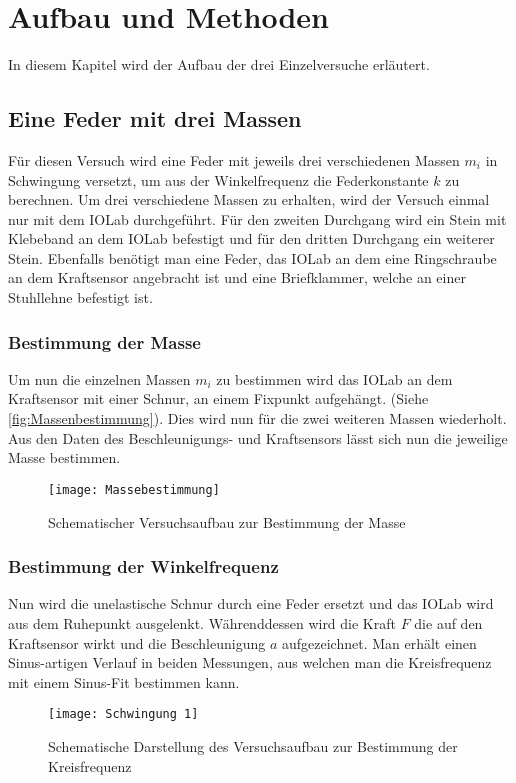 
\chapter{Aufbau und Methoden}
\label{sec:aufbau}
In diesem Kapitel wird der Aufbau der drei Einzelversuche erläutert.
\section{Eine Feder mit drei Massen}
Für diesen Versuch wird eine Feder mit jeweils drei verschiedenen Massen $m_i$ in Schwingung versetzt, um aus der Winkelfrequenz die Federkonstante $k$ zu berechnen. Um drei verschiedene Massen zu erhalten, wird der Versuch einmal nur mit dem IOLab durchgeführt. Für den zweiten Durchgang wird ein Stein mit Klebeband an dem IOLab befestigt und für den dritten Durchgang ein weiterer Stein. Ebenfalls benötigt man eine Feder, das IOLab an dem eine Ringschraube an dem Kraftsensor angebracht ist und eine Briefklammer, welche an einer Stuhllehne befestigt ist.
\subsection{Bestimmung der Masse}
Um nun die einzelnen Massen $m_i$ zu bestimmen wird das IOLab an dem Kraftsensor mit einer Schnur, an einem Fixpunkt aufgehängt. (Siehe \autoref{fig:Massenbestimmung}). Dies wird nun für die zwei weiteren Massen wiederholt. Aus den Daten des Beschleunigungs- und Kraftsensors lässt sich nun die jeweilige Masse bestimmen. 
\begin{figure}[H]
	\centering
	\texttt{[image: Massebestimmung]}
	\caption[Versuchsaufbau der Massebestimmung]{Schematischer Versuchsaufbau zur Bestimmung der Masse}
	\label{fig:Massenbestimmung}
\end{figure}
\subsection{Bestimmung der Winkelfrequenz}
Nun wird die unelastische Schnur durch eine Feder ersetzt und das IOLab wird aus dem Ruhepunkt ausgelenkt. Währenddessen wird die Kraft $F$ die auf den Kraftsensor wirkt und die Beschleunigung $a$ aufgezeichnet. Man erhält einen Sinus-artigen Verlauf in beiden Messungen, aus welchen man die Kreisfrequenz mit einem Sinus-Fit bestimmen kann.
\begin{figure}[H]
	\centering
	\texttt{[image: Schwingung 1]}
	\caption[Versuchsaufbau für eine Feder]{Schematische Darstellung des Versuchsaufbau zur Bestimmung der Kreisfrequenz}
	\label{fig:Schwingungsperiode1}
\end{figure}
